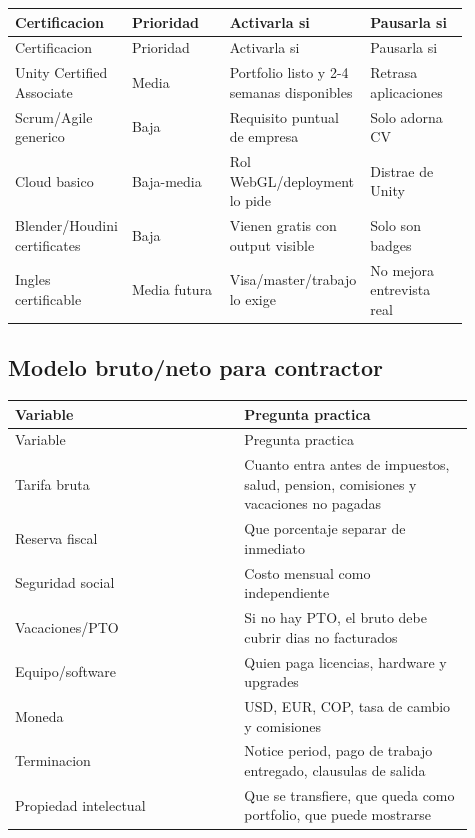 \begin{center}
\scriptsize
\begin{longtable}{>{\raggedright\arraybackslash}p{0.225\linewidth} >{\raggedright\arraybackslash}p{0.225\linewidth} >{\raggedright\arraybackslash}p{0.225\linewidth} >{\raggedright\arraybackslash}p{0.225\linewidth}}
\toprule
Certificacion & Prioridad & Activarla si & Pausarla si \\
\midrule
\endfirsthead
\toprule
Certificacion & Prioridad & Activarla si & Pausarla si \\
\midrule
\endhead
Unity Certified Associate & Media & Portfolio listo y 2-4 semanas disponibles & Retrasa aplicaciones \\
Scrum/Agile generico & Baja & Requisito puntual de empresa & Solo adorna CV \\
Cloud basico & Baja-media & Rol WebGL/deployment lo pide & Distrae de Unity \\
Blender/Houdini certificates & Baja & Vienen gratis con output visible & Solo son badges \\
Ingles certificable & Media futura & Visa/master/trabajo lo exige & No mejora entrevista real \\
\bottomrule
\end{longtable}
\end{center}


\subsection{Modelo bruto/neto para contractor}


\begin{center}
\scriptsize
\begin{longtable}{>{\raggedright\arraybackslash}p{0.455\linewidth} >{\raggedright\arraybackslash}p{0.455\linewidth}}
\toprule
Variable & Pregunta practica \\
\midrule
\endfirsthead
\toprule
Variable & Pregunta practica \\
\midrule
\endhead
Tarifa bruta & Cuanto entra antes de impuestos, salud, pension, comisiones y vacaciones no pagadas \\
Reserva fiscal & Que porcentaje separar de inmediato \\
Seguridad social & Costo mensual como independiente \\
Vacaciones/PTO & Si no hay PTO, el bruto debe cubrir dias no facturados \\
Equipo/software & Quien paga licencias, hardware y upgrades \\
Moneda & USD, EUR, COP, tasa de cambio y comisiones \\
Terminacion & Notice period, pago de trabajo entregado, clausulas de salida \\
Propiedad intelectual & Que se transfiere, que queda como portfolio, que puede mostrarse \\
\bottomrule
\end{longtable}
\end{center}


